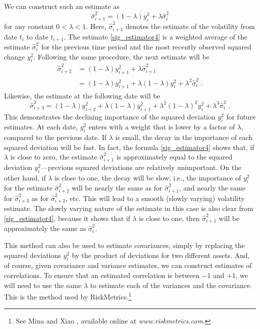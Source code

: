 We can construct such an estimate as
\begin{equation}\label{sig_estimator4}
\hat{\sigma}^2_{i+1} = (1-\lambda) y_{i}^2 + \lambda\hat{\sigma}^2_{i}
\end{equation}
for any constant $0<\lambda<1$.
Here, $\hat{\sigma}^2_{i+1}$ denotes the estimate of the volatility from date $t_{i}$ to date $t_{i+1}$.  The estimate \eqref{sig_estimator4} is a weighted average of the estimate $\hat{\sigma}^2_{i}$ for the previous time period and the most recently observed squared change $y_{i}^2$.  Following the same procedure, the next estimate will be
\begin{align*}
\hat{\sigma}^2_{i+2}& = (1-\lambda) y_{i+1}^2 + \lambda\hat{\sigma}^2_{i+1}\\
&= (1-\lambda) y_{i+1}^2 + \lambda(1-\lambda)  y_{i}^2 + \lambda^2\hat{\sigma}^2_{i}\;.
\end{align*}
Likewise, the estimate at the following date will be
$$\hat{\sigma}^2_{i+3} = (1-\lambda) y_{i+2}^2 +\lambda(1-\lambda) y_{i+1}^2 + \lambda^2(1-\lambda)^2  y_{i}^2 +\lambda^{3}\hat{\sigma}^2_{i}\; .$$
This demonstrates the declining importance of the squared deviation $y_{i}^2$ for future estimates.  At each date, $y_{i}^2$ enters with a weight that is lower by a factor of $\lambda$, compared to the previous date. 
If $\lambda$ is small, the decay in the importance of each squared deviation will be fast.  In fact, the formula \eqref{sig_estimator4} shows that, if $\lambda$ is close to zero, the estimate $\hat{\sigma}_{i+1}^2$ is approximately equal to the squared deviation $y_i^2$---previous squared deviations are relatively unimportant.  On the other hand, if $\lambda$ is close to one, the decay will be slow; i.e., the importance of $y_i^2$ for the estimate $\hat{\sigma}^2_{i+2}$ will be nearly the same as for $\hat{\sigma}^2_{i+1}$, and nearly the same for $\hat{\sigma}^2_{i+3}$ as for $\hat{\sigma}^2_{i+2}$, etc.   This will lead to a smooth (slowly varying) volatility estimate.  The slowly varying nature of the estimate in this case is also clear from \eqref{sig_estimator4}, because it shows that if $\lambda$ is close to one, then $\hat{\sigma}^2_{i+1}$ will be approximately the same as $\hat{\sigma}^2_{i}$.

This method can also be used to estimate covariances, simply by replacing the squared deviations $y_i^2$ by the product of deviations for two different assets.  And, of course, given covariance and variance estimates, we can construct estimates of correlations.  To ensure that an estimated correlation is between $-1$ and $+1$, we will need to use the same $\lambda$ to estimate each of the variances and the covariance.  This is the method used by RiskMetrics.\footnote{See Mina and Xiao \cite{MX}, available online at \emph{www.riskmetrics.com}.} 

